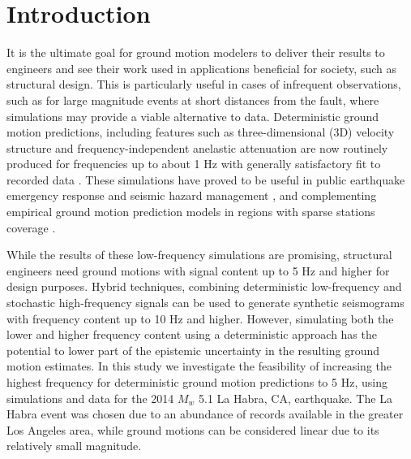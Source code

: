 \section{Introduction} \label{highf:intro}
It is the ultimate goal for ground motion modelers to deliver their results to engineers and see their work used in applications beneficial for society, such as structural design. This is particularly useful in cases of infrequent observations, such as for large magnitude events at short distances from the fault, where simulations may provide a viable alternative to data. Deterministic ground motion predictions, including features such as three-dimensional (3D) velocity structure and frequency-independent anelastic attenuation are now routinely produced for frequencies up to about 1 Hz with generally satisfactory fit to recorded data . These simulations have proved to be useful in public earthquake emergency response and seismic hazard management \citep[e.g., the SHAKEOUT scenario; ][]{jones2008shakeout}, and complementing empirical ground motion prediction models in regions with sparse stations coverage .

While the results of these low-frequency simulations are promising, structural engineers need ground motions with signal content up to 5 Hz and higher for design purposes. Hybrid techniques, combining deterministic low-frequency and stochastic high-frequency signals  can be used to generate synthetic seismograms with frequency content up to 10 Hz and higher. However, simulating both the lower and higher frequency content using a deterministic approach has the potential to lower part of the epistemic uncertainty in the resulting ground motion estimates. In this study we investigate the feasibility of increasing the highest frequency for deterministic ground motion predictions to 5 Hz, using simulations and data for the 2014 $M_w$ 5.1 La Habra, CA, earthquake. The La Habra event was chosen due to an abundance of records available in the greater Los Angeles area, while ground motions can be considered linear due to its relatively small magnitude.


